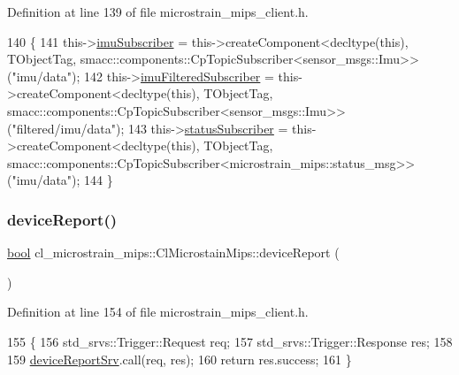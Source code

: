 Definition at line 139 of file microstrain\+\_\+mips\+\_\+client.\+h.


\begin{DoxyCode}
140     \{
141         this->\hyperlink{classcl__microstrain__mips_1_1ClMicrostainMips_a71648a9d970672d017c90bd3724b1104}{imuSubscriber} = this->createComponent<decltype(this), TObjectTag,
       smacc::components::CpTopicSubscriber<sensor\_msgs::Imu>>(\textcolor{stringliteral}{"imu/data"});
142         this->\hyperlink{classcl__microstrain__mips_1_1ClMicrostainMips_ae53fdf79a14adb9c3eff4a8966a092ff}{imuFilteredSubscriber} = this->createComponent<decltype(this),
       TObjectTag, smacc::components::CpTopicSubscriber<sensor\_msgs::Imu>>(\textcolor{stringliteral}{"filtered/imu/data"});
143         this->\hyperlink{classcl__microstrain__mips_1_1ClMicrostainMips_a0da593a071ac7ff8dd842b934120e315}{statusSubscriber} = this->createComponent<decltype(this), TObjectTag,
       smacc::components::CpTopicSubscriber<microstrain\_mips::status\_msg>>(\textcolor{stringliteral}{"imu/data"});
144     \}
\end{DoxyCode}
\mbox{\label{classcl__microstrain__mips_1_1ClMicrostainMips_a4987d87f50c6ce20102f6e3359619b88}} 
\subsubsection{\texorpdfstring{device\+Report()}{deviceReport()}}
{\footnotesize\ttfamily \hyperlink{classbool}{bool} cl\+\_\+microstrain\+\_\+mips\+::\+Cl\+Microstain\+Mips\+::device\+Report (\begin{DoxyParamCaption}{ }\end{DoxyParamCaption})\hspace{0.3cm}{\ttfamily [inline]}}



Definition at line 154 of file microstrain\+\_\+mips\+\_\+client.\+h.


\begin{DoxyCode}
155     \{
156         std\_srvs::Trigger::Request req;
157         std\_srvs::Trigger::Response res;
158 
159         \hyperlink{classcl__microstrain__mips_1_1ClMicrostainMips_a905c9403005198bb4dd62918721b7d10}{deviceReportSrv}.call(req, res);
160         \textcolor{keywordflow}{return} res.success;
161     \}
\end{DoxyCode}
\mbox{\label{classcl__microstrain__mips_1_1ClMicrostainMips_aac0a271bd226038aca61077c08c6427b}} 
